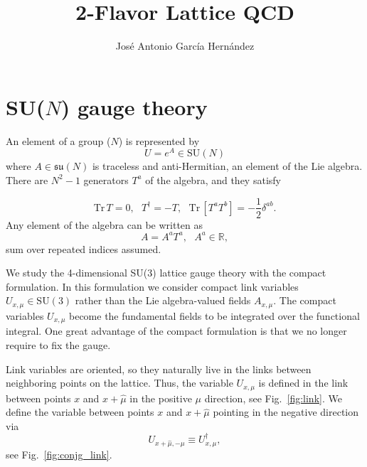 \documentclass[12pt,a4paper]{article}
\author{José Antonio García Hernández}
\title{2-Flavor Lattice QCD}
\newcommand{\tr}{\text{Tr}\,}
\newcommand{\SU}[1]{\text{SU}({#1})}
\newcommand{\su}[1]{\mathfrak{su}({#1})}
\begin{document}
\maketitle

\section{SU($N$) gauge theory}

    An element of a group \SU{$N$} is represented by 
    \begin{equation}
        U = e^{A} \in \SU{N}
    \end{equation}
where $A\in\su{N}$ is traceless and anti-Hermitian, an element of the Lie algebra. There are $N^2-1$ generators $T^a$ of the algebra, and they satisfy

    \begin{equation}
       \tr T = 0, \ \ \ T^{\dagger} = -T, \ \ \ \tr [T^aT^b] = -\frac{1}{2}\delta^{ab}.
    \end{equation}
    Any element of the algebra can be written as
    \begin{equation}
        A = A^aT^a , \ \ \ A^a \in \mathbb{R},
    \end{equation}
    sum over repeated indices assumed.

    
    
    
    We study the 4-dimensional SU(3) lattice gauge theory with the compact formulation. In this formulation we consider compact link variables $U_{x,\mu}\in \text{SU}(3)$ rather than the Lie algebra-valued fields $A_{x,\mu}$. The compact variables $U_{x,\mu}$ become the fundamental fields to be integrated over the functional integral. One great advantage of the compact formulation is that we no longer require to fix the gauge.

Link variables are oriented, so they naturally live in the links between neighboring points on the lattice. Thus, the variable $U_{x,\mu}$ is defined in the link between points $x$ and $x + \hat \mu$ in the positive $\mu$ direction, see Fig.\ \ref{fig:link}. We define the variable between points $x$ and $x + \hat \mu$ pointing in the negative direction via
\begin{equation}
	U_{x+\hat\mu,-\mu} \equiv  U^{\dagger}_{x,\mu}, 
\end{equation}
see Fig.\ \ref{fig:conjg_link}.
\end{document}
